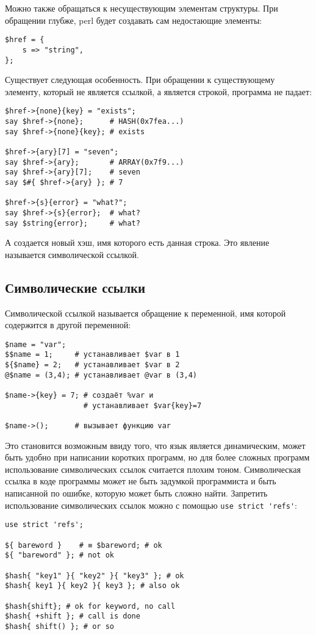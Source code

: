 Можно также обращаться к несуществующим элементам структуры. При обращении глубже, perl будет создавать сам недостающие элементы:
\begin{verbatim}
$href = {
    s => "string",
};
\end{verbatim}
Существует следующая особенность. При обращении к существующему элементу, который не является ссылкой, а является строкой, программа не падает:
\begin{verbatim}
$href->{none}{key} = "exists";
say $href->{none};      # HASH(0x7fea...)
say $href->{none}{key}; # exists

$href->{ary}[7] = "seven";
say $href->{ary};       # ARRAY(0x7f9...)
say $href->{ary}[7];    # seven
say $#{ $href->{ary} }; # 7

$href->{s}{error} = "what?";
say $href->{s}{error};  # what?
say $string{error};     # what?
\end{verbatim}
А создается новый хэш, имя которого есть данная строка. Это явление называется символической ссылкой.

\subsection{Символические ссылки} %
Символической ссылкой называется обращение к переменной, имя которой содержится в другой переменной:
\begin{verbatim}
$name = "var";
$$name = 1;     # устанавливает $var в 1
${$name} = 2;   # устанавливает $var в 2
@$name = (3,4); # устанавливает @var в (3,4)

$name->{key} = 7; # создаёт %var и
                  # устанавливает $var{key}=7

$name->();      # вызывает функцию var
\end{verbatim}
Это становится возможным ввиду того, что язык является динамическим, может быть удобно при написании коротких программ, но для более сложных программ использование символических ссылок считается плохим тоном. Символическая ссылка в коде программы может не быть задумкой программиста и быть написанной по ошибке, которую может быть сложно найти. Запретить использование символических ссылок можно с помощью \verb|use strict 'refs'|:
\begin{verbatim}
use strict 'refs';

${ bareword }    # ≡ $bareword; # ok
${ "bareword" }; # not ok

$hash{ "key1" }{ "key2" }{ "key3" }; # ok
$hash{ key1 }{ key2 }{ key3 }; # also ok

$hash{shift}; # ok for keyword, no call
$hash{ +shift }; # call is done
$hash{ shift() }; # or so
\end{verbatim}

